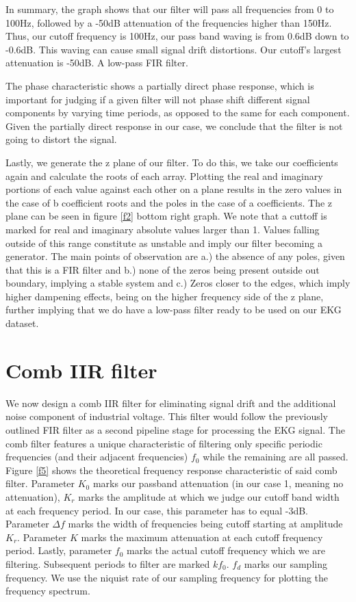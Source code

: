 \documentclass[10pt,a4paper,twocolumn]{article}
\begin{document}
In summary, the graph shows that our filter will pass all frequencies from 0 to 100Hz, followed by a -50dB attenuation of the frequencies higher than 150Hz. Thus, our cutoff frequency is 100Hz, our pass band waving is from 0.6dB down to -0.6dB. This waving can cause small signal drift distortions. Our cutoff's largest attenuation is -50dB. A low-pass FIR filter.

The phase characteristic shows a partially direct phase response, which is important for judging if a given filter will not phase shift different signal components by varying time periods, as opposed to the same for each component. Given the partially direct response in our case, we conclude that the filter is not going to distort the signal.

Lastly, we generate the z plane of our filter. To do this, we take our coefficients again and calculate the roots of each array. Plotting the real and imaginary portions of each value against each other on a plane results in the zero values in the case of b coefficient roots and the poles in the case of a coefficients. The z plane can be seen in figure \ref{f2} bottom right graph. We note that a cuttoff is marked for real and imaginary absolute values larger than 1. Values falling outside of this range constitute as unstable and imply our filter becoming a generator. The main points of observation are a.) the absence of any poles, given that this is a FIR filter and b.) none of the zeros being present outside out boundary, implying a stable system and c.) Zeros closer to the edges, which imply higher dampening effects, being on the higher frequency side of the z plane, further implying that we do have a low-pass filter ready to be used on our EKG dataset.



\section*{Comb IIR filter}

We now design a comb IIR filter for eliminating signal drift and the additional noise component of industrial voltage. This filter would follow the previously outlined FIR filter as a second pipeline stage for processing the EKG signal. The comb filter features a unique characteristic of filtering only specific periodic frequencies (and their adjacent frequencies) $f_0$ while the remaining are all passed. Figure \ref{f5}  shows the theoretical frequency response characteristic of said comb filter\cite{lab2_ref}.  Parameter $K_0$ marks our passband attenuation (in our case 1, meaning no attenuation), $K_r$ marks the amplitude at which we judge our cutoff band width at each frequency period. In our case, this parameter has to equal -3dB. Parameter $\Delta f$ marks the width of frequencies being cutoff starting at amplitude $K_r$. Parameter $K$ marks the maximum attenuation at each cutoff frequency period. Lastly, parameter $f_0$ marks the actual cutoff frequency which we are filtering. Subsequent periods to filter are marked $kf_0$. $f_d$ marks our sampling frequency. We use the niquist rate of our sampling frequency for plotting the frequency spectrum.
\end{document}
